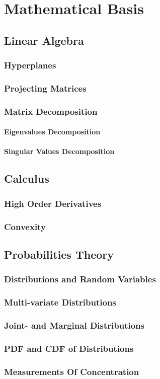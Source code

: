 \chapter{Mathematical Basis}
    \section{Linear Algebra}
        \subsection{Hyperplanes}
        \subsection{Projecting Matrices}
        \subsection{Matrix Decomposition}
            \subsubsection{Eigenvalues Decomposition}
            \subsubsection{Singular Values Decomposition}
    \section{Calculus}
        \subsection{High Order Derivatives}
        \subsection{Convexity}
    \section{Probabilities Theory}
        \subsection{Distributions and Random Variables}
        \subsection{Multi-variate Distributions}
        \subsection{Joint- and Marginal Distributions}
        \subsection{PDF and CDF of Distributions}
        \subsection{Measurements Of Concentration}